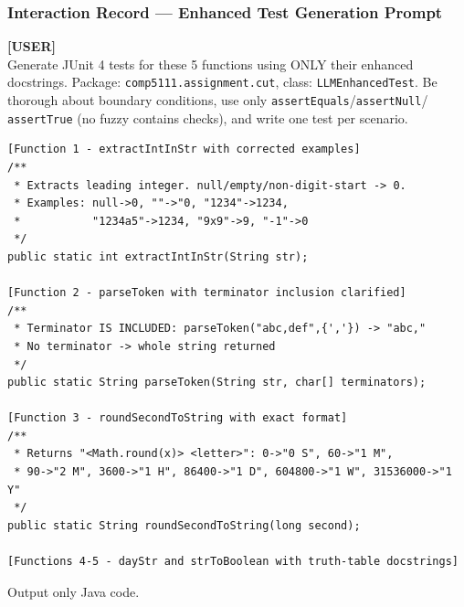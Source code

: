 \documentclass[acmsmall,nonacm]{acmart}
\begin{document}
\subsubsection*{Interaction Record --- Enhanced Test Generation Prompt}

\begin{promptbox}
\textbf{[USER]}\\[4pt]
Generate JUnit 4 tests for these 5 functions using ONLY their enhanced docstrings.
Package: \texttt{comp5111.assignment.cut}, class: \texttt{LLMEnhancedTest}.
Be thorough about boundary conditions, use only \texttt{assertEquals}/\texttt{assertNull}/
\texttt{assertTrue} (no fuzzy contains checks), and write one test per scenario.

\begin{verbatim}
[Function 1 - extractIntInStr with corrected examples]
/**
 * Extracts leading integer. null/empty/non-digit-start -> 0.
 * Examples: null->0, ""->"0, "1234"->1234,
 *           "1234a5"->1234, "9x9"->9, "-1"->0
 */
public static int extractIntInStr(String str);

[Function 2 - parseToken with terminator inclusion clarified]
/**
 * Terminator IS INCLUDED: parseToken("abc,def",{','}) -> "abc,"
 * No terminator -> whole string returned
 */
public static String parseToken(String str, char[] terminators);

[Function 3 - roundSecondToString with exact format]
/**
 * Returns "<Math.round(x)> <letter>": 0->"0 S", 60->"1 M",
 * 90->"2 M", 3600->"1 H", 86400->"1 D", 604800->"1 W", 31536000->"1 Y"
 */
public static String roundSecondToString(long second);

[Functions 4-5 - dayStr and strToBoolean with truth-table docstrings]
\end{verbatim}

Output only Java code.
\end{promptbox}

\bigskip
\end{document}
